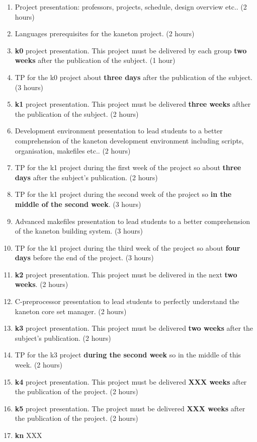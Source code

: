 \begin{multicols}{2}
\begin{enumerate}
  \item
    Project presentation: professors, projects, schedule, design overview
    etc.. (2 hours)
  \item
    Languages prerequisites for the kaneton project. (2 hours)
  \item
    \textbf{k0} project presentation. This project must be delivered by
    each group \textbf{two weeks} after the publication of the
    subject. (1 hour)
  \item
    TP for the k0 project about \textbf{three days} after the publication of
    the subject. (3 hours)
  \item
    \textbf{k1} project presentation. This project must be delivered
    \textbf{three weeks} afther the publication of the subject. (2 hours)
  \item
    Development environment presentation to lead students to a better
    comprehension of the kaneton development environment including scripts,
    organisation, makefiles etc.. (2 hours)
  \item
    TP for the k1 project during the first week of the project so about
    \textbf{three days} after the subject's publication. (2 hours)
  \item
    TP for the k1 project during the second week of the project so
    \textbf{in the middle of the second week}. (3 hours)
  \item
    Advanced makefiles presentation to lead students to a better
    comprehension of the kaneton building system. (3 hours)
  \item
    TP for the k1 project during the third week of the project so about
    \textbf{four days} before the end of the project. (3 hours)
  \item
    \textbf{k2} project presentation. This project must be delivered
    in the next \textbf{two weeks}. (2 hours)
  \item
    C-preprocessor presentation to lead students to perfectly understand
    the kaneton core set manager. (2 hours)
  \item
    \textbf{k3} project presentation. This project must be delivered
    \textbf{two weeks} after the subject's publication. (2 hours)
  \item
    TP for the k3 project \textbf{during the second week} so in the
    middle of this week. (2 hours)
  \item
    \textbf{k4} project presentation. This project must be delivered
    \textbf{XXX weeks} after the publication of the project. (2 hours)
  \item
    \textbf{k5} project presentation. The project must be delivered
    \textbf{XXX weeks} after the publication of the project. (2 hours)
  \item
    \textbf{kn} XXX
\end{enumerate}




\end{multicols}
